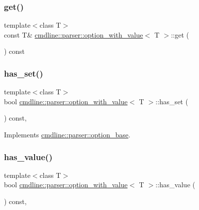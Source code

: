 \subsubsection{\texorpdfstring{get()}{get()}}
{\footnotesize\ttfamily template$<$class T$>$ \\
const T\& \mbox{\hyperlink{classcmdline_1_1parser_1_1option__with__value}{cmdline\+::parser\+::option\+\_\+with\+\_\+value}}$<$ T $>$\+::get (\begin{DoxyParamCaption}{ }\end{DoxyParamCaption}) const\hspace{0.3cm}{\ttfamily [inline]}}

\mbox{\label{classcmdline_1_1parser_1_1option__with__value_aafe60a7f6f3e8a6928517382689e4867}} 
\subsubsection{\texorpdfstring{has\_set()}{has\_set()}}
{\footnotesize\ttfamily template$<$class T$>$ \\
bool \mbox{\hyperlink{classcmdline_1_1parser_1_1option__with__value}{cmdline\+::parser\+::option\+\_\+with\+\_\+value}}$<$ T $>$\+::has\+\_\+set (\begin{DoxyParamCaption}{ }\end{DoxyParamCaption}) const\hspace{0.3cm}{\ttfamily [inline]}, {\ttfamily [virtual]}}



Implements \mbox{\hyperlink{classcmdline_1_1parser_1_1option__base_aa948d89b57f4cd901bc20075ec277a04}{cmdline\+::parser\+::option\+\_\+base}}.

\mbox{\label{classcmdline_1_1parser_1_1option__with__value_a4bf8da186590bb770ea1d29cff75ec19}} 
\subsubsection{\texorpdfstring{has\_value()}{has\_value()}}
{\footnotesize\ttfamily template$<$class T$>$ \\
bool \mbox{\hyperlink{classcmdline_1_1parser_1_1option__with__value}{cmdline\+::parser\+::option\+\_\+with\+\_\+value}}$<$ T $>$\+::has\+\_\+value (\begin{DoxyParamCaption}{ }\end{DoxyParamCaption}) const\hspace{0.3cm}{\ttfamily [inline]}, {\ttfamily [virtual]}}



